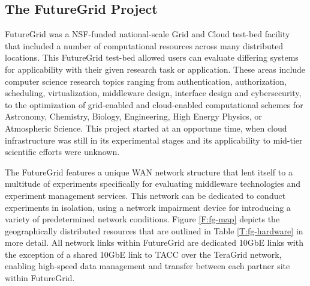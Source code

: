 \subsection{The FutureGrid Project}


FutureGrid was a NSF-funded national-scale Grid and Cloud test-bed facility that included a number of computational resources across many distributed locations.  This FutureGrid test-bed allowed users can evaluate differing systems for applicability with their given research task or application. These areas include computer science research topics ranging from authentication, authorization, scheduling, virtualization, middleware design, interface design and cybersecurity, to the optimization of grid-enabled and cloud-enabled computational schemes for  Astronomy, Chemistry, Biology, Engineering, High Energy Physics, or Atmospheric Science. This project started at an opportune time, when cloud infrastructure was still in its experimental stages and its applicability to mid-tier scientific efforts were unknown. 

The FutureGrid  features a unique WAN network structure that lent itself to a multitude of experiments specifically for evaluating middleware technologies and experiment management services.  This network can be dedicated to conduct experiments in isolation, using a network impairment device for introducing a variety of predetermined network conditions. Figure \ref{F:fg-map} depicts the geographically distributed resources that are outlined in Table \ref{T:fg-hardware} in more detail. All network links within FutureGrid are dedicated 10GbE links with the exception of a shared 10GbE link to TACC over the TeraGrid \cite{berman2001tkg, catlett2002philosophy} network, enabling high-speed data management and transfer between each partner site within FutureGrid.
   
